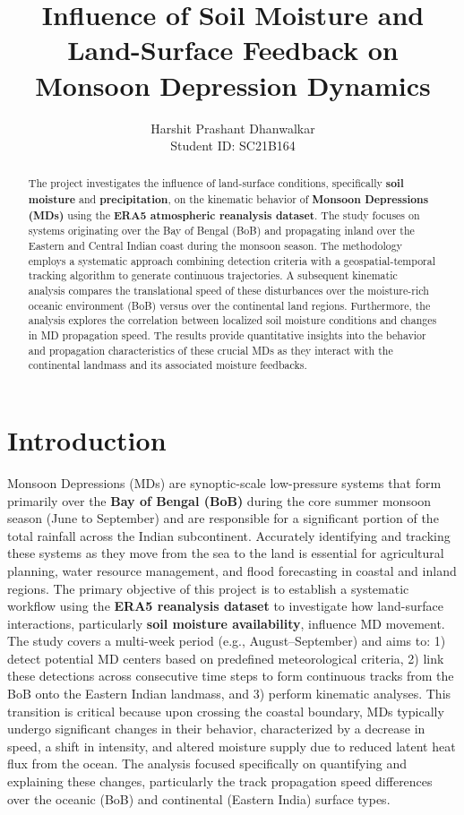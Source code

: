 \documentclass[11pt, a4paper]{article}
\title{\textbf{Influence of Soil Moisture and Land-Surface Feedback on Monsoon Depression Dynamics}}
\author{Harshit Prashant Dhanwalkar \\ \small Student ID: SC21B164}
\date{}
\begin{document}
\maketitle

\begin{abstract}
	The project investigates the influence of land-surface conditions, specifically \textbf{soil moisture} and \textbf{precipitation}, on the kinematic behavior of \textbf{Monsoon Depressions (MDs)} using the \textbf{ERA5 atmospheric reanalysis dataset}. The study focuses on systems originating over the Bay of Bengal (BoB) and propagating inland over the Eastern and Central Indian coast during the monsoon season. The methodology employs a systematic approach combining detection criteria with a geospatial-temporal tracking algorithm to generate continuous trajectories. A subsequent kinematic analysis compares the translational speed of these disturbances over the moisture-rich oceanic environment (BoB) versus over the continental land regions. Furthermore, the analysis explores the correlation between localized soil moisture conditions and changes in MD propagation speed. The results provide quantitative insights into the behavior and propagation characteristics of these crucial MDs as they interact with the continental landmass and its associated moisture feedbacks.
\end{abstract}

\section{Introduction}
Monsoon Depressions (MDs) are synoptic-scale low-pressure systems that form primarily over the \textbf{Bay of Bengal (BoB)} during the core summer monsoon season (June to September) and are responsible for a significant portion of the total rainfall across the Indian subcontinent. Accurately identifying and tracking these systems as they move from the sea to the land is essential for agricultural planning, water resource management, and flood forecasting in coastal and inland regions. The primary objective of this project is to establish a systematic workflow using the \textbf{ERA5 reanalysis dataset} to investigate how land-surface interactions, particularly \textbf{soil moisture availability}, influence MD movement. The study covers a multi-week period (e.g., August--September) and aims to: 1) detect potential MD centers based on predefined meteorological criteria, 2) link these detections across consecutive time steps to form continuous tracks from the BoB onto the Eastern Indian landmass, and 3) perform kinematic analyses. This transition is critical because upon crossing the coastal boundary, MDs typically undergo significant changes in their behavior, characterized by a decrease in speed, a shift in intensity, and altered moisture supply due to reduced latent heat flux from the ocean. The analysis focused specifically on quantifying and explaining these changes, particularly the track propagation speed differences over the oceanic (BoB) and continental (Eastern India) surface types.
\end{document}
